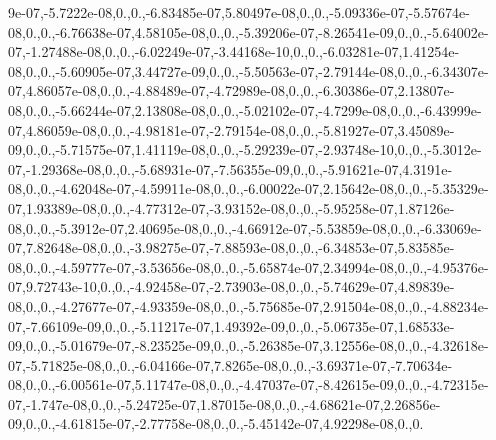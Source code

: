 {9e-\/07,-\/5.\-7222e-\/08,0.,0.,-\/6.\-83485e-\/07,5.\-80497e-\/08,0.,0.,-\/5.\-09336e-\/07,-\/5.\-57674e-\/08,0.,0.,-\/6.\-76638e-\/07,4.\-58105e-\/08,0.,0.,-\/5.\-39206e-\/07,-\/8.\-26541e-\/09,0.,0.,-\/5.\-64002e-\/07,-\/1.\-27488e-\/08,0.,0.,-\/6.\-02249e-\/07,-\/3.\-44168e-\/10,0.,0.,-\/6.\-03281e-\/07,1.\-41254e-\/08,0.,0.,-\/5.\-60905e-\/07,3.\-44727e-\/09,0.,0.,-\/5.\-50563e-\/07,-\/2.\-79144e-\/08,0.,0.,-\/6.\-34307e-\/07,4.\-86057e-\/08,0.,0.,-\/4.\-88489e-\/07,-\/4.\-72989e-\/08,0.,0.,-\/6.\-30386e-\/07,2.\-13807e-\/08,0.,0.,-\/5.\-66244e-\/07,2.\-13808e-\/08,0.,0.,-\/5.\-02102e-\/07,-\/4.\-7299e-\/08,0.,0.,-\/6.\-43999e-\/07,4.\-86059e-\/08,0.,0.,-\/4.\-98181e-\/07,-\/2.\-79154e-\/08,0.,0.,-\/5.\-81927e-\/07,3.\-45089e-\/09,0.,0.,-\/5.\-71575e-\/07,1.\-41119e-\/08,0.,0.,-\/5.\-29239e-\/07,-\/2.\-93748e-\/10,0.,0.,-\/5.\-3012e-\/07,-\/1.\-29368e-\/08,0.,0.,-\/5.\-68931e-\/07,-\/7.\-56355e-\/09,0.,0.,-\/5.\-91621e-\/07,4.\-3191e-\/08,0.,0.,-\/4.\-62048e-\/07,-\/4.\-59911e-\/08,0.,0.,-\/6.\-00022e-\/07,2.\-15642e-\/08,0.,0.,-\/5.\-35329e-\/07,1.\-93389e-\/08,0.,0.,-\/4.\-77312e-\/07,-\/3.\-93152e-\/08,0.,0.,-\/5.\-95258e-\/07,1.\-87126e-\/08,0.,0.,-\/5.\-3912e-\/07,2.\-40695e-\/08,0.,0.,-\/4.\-66912e-\/07,-\/5.\-53859e-\/08,0.,0.,-\/6.\-33069e-\/07,7.\-82648e-\/08,0.,0.,-\/3.\-98275e-\/07,-\/7.\-88593e-\/08,0.,0.,-\/6.\-34853e-\/07,5.\-83585e-\/08,0.,0.,-\/4.\-59777e-\/07,-\/3.\-53656e-\/08,0.,0.,-\/5.\-65874e-\/07,2.\-34994e-\/08,0.,0.,-\/4.\-95376e-\/07,9.\-72743e-\/10,0.,0.,-\/4.\-92458e-\/07,-\/2.\-73903e-\/08,0.,0.,-\/5.\-74629e-\/07,4.\-89839e-\/08,0.,0.,-\/4.\-27677e-\/07,-\/4.\-93359e-\/08,0.,0.,-\/5.\-75685e-\/07,2.\-91504e-\/08,0.,0.,-\/4.\-88234e-\/07,-\/7.\-66109e-\/09,0.,0.,-\/5.\-11217e-\/07,1.\-49392e-\/09,0.,0.,-\/5.\-06735e-\/07,1.\-68533e-\/09,0.,0.,-\/5.\-01679e-\/07,-\/8.\-23525e-\/09,0.,0.,-\/5.\-26385e-\/07,3.\-12556e-\/08,0.,0.,-\/4.\-32618e-\/07,-\/5.\-71825e-\/08,0.,0.,-\/6.\-04166e-\/07,7.\-8265e-\/08,0.,0.,-\/3.\-69371e-\/07,-\/7.\-70634e-\/08,0.,0.,-\/6.\-00561e-\/07,5.\-11747e-\/08,0.,0.,-\/4.\-47037e-\/07,-\/8.\-42615e-\/09,0.,0.,-\/4.\-72315e-\/07,-\/1.\-747e-\/08,0.,0.,-\/5.\-24725e-\/07,1.\-87015e-\/08,0.,0.,-\/4.\-68621e-\/07,2.\-26856e-\/09,0.,0.,-\/4.\-61815e-\/07,-\/2.\-77758e-\/08,0.,0.,-\/5.\-45142e-\/07,4.\-92298e-\/08,0.,0.}
